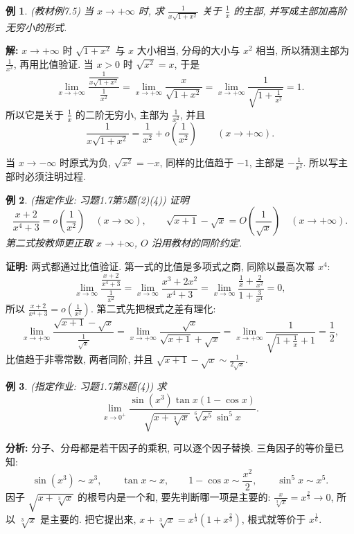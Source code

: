 \documentclass[UTF8,openany]{ctexbook}
\theoremstyle{chinesetextbook}
\newtheorem{example}{例}[section]
\newenvironment{cnproof}{\par\indent\textbf{证明:} \ignorespaces}{\par}
\newenvironment{cnsolution}{\par\indent\textbf{解:} \ignorespaces}{\par}
\begin{document}
\begin{example}
\textnormal{(教材例7.5)} 当 $x\to+\infty$ 时, 求 $\displaystyle\frac1{x\sqrt{1+x^2}}$ 关于 $\displaystyle\frac1x$ 的主部, 并写成主部加高阶无穷小的形式.
\end{example}
\begin{cnsolution}
$x\to+\infty$ 时 $\sqrt{1+x^2}$ 与 $x$ 大小相当, 分母的大小与 $x^2$ 相当, 所以猜测主部为 $\displaystyle\frac1{x^2}$, 再用比值验证. 当 $x>0$ 时 $\sqrt{x^2}=x$, 于是
\[
\lim_{x\to+\infty}\frac{\frac1{x\sqrt{1+x^2}}}{\frac1{x^2}}=\lim_{x\to+\infty}\frac x{\sqrt{1+x^2}}=\lim_{x\to+\infty}\frac1{\sqrt{1+\frac1{x^2}}}=1.
\]
所以它是关于 $\displaystyle\frac1x$ 的二阶无穷小, 主部为 $\displaystyle\frac1{x^2}$, 并且
\[
\frac1{x\sqrt{1+x^2}}=\frac1{x^2}+o\!\left(\frac1{x^2}\right)\qquad(x\to+\infty).
\]
\end{cnsolution}
当 $x\to-\infty$ 时原式为负, $\sqrt{x^2}=-x$, 同样的比值趋于 $-1$, 主部是 $\displaystyle-\frac1{x^2}$. 所以写主部时必须注明过程.
\begin{example}
\textnormal{(指定作业: 习题1.7第5题(2)(4))} 证明
\[
\frac{x+2}{x^4+3}=o\!\left(\frac1{x^2}\right)\quad(x\to\infty),\qquad\sqrt{x+1}-\sqrt x=O\!\left(\frac1{\sqrt x}\right)\quad(x\to+\infty).
\]
第二式按教师更正取 $x\to+\infty$, $O$ 沿用教材的同阶约定.
\end{example}
\begin{cnproof}
两式都通过比值验证. 第一式的比值是多项式之商, 同除以最高次幂 $x^4$:
\[
\lim_{x\to\infty}\frac{\frac{x+2}{x^4+3}}{\frac1{x^2}}=\lim_{x\to\infty}\frac{x^3+2x^2}{x^4+3}=\lim_{x\to\infty}\frac{\frac1x+\frac2{x^2}}{1+\frac3{x^4}}=0,
\]
所以 $\displaystyle\frac{x+2}{x^4+3}=o\!\left(\frac1{x^2}\right)$. 第二式先把根式之差有理化:
\[
\lim_{x\to+\infty}\frac{\sqrt{x+1}-\sqrt x}{\frac1{\sqrt x}}=\lim_{x\to+\infty}\frac{\sqrt x}{\sqrt{x+1}+\sqrt x}=\lim_{x\to+\infty}\frac1{\sqrt{1+\frac1x}+1}=\frac12,
\]
比值趋于非零常数, 两者同阶, 并且 $\displaystyle\sqrt{x+1}-\sqrt x\sim\frac1{2\sqrt x}$.
\end{cnproof}
\begin{example}
\textnormal{(指定作业: 习题1.7第8题(4))} 求
\[
\lim_{x\to0^+}\frac{\sin(x^3)\tan x(1-\cos x)}{\sqrt{x+\sqrt[3]x}\,\sqrt[6]{x^5}\sin^5x}.
\]
\end{example}
\par\indent\textbf{分析:} 分子、分母都是若干因子的乘积, 可以逐个因子替换. 三角因子的等价量已知:
\[
\sin(x^3)\sim x^3,\qquad\tan x\sim x,\qquad1-\cos x\sim\frac{x^2}2,\qquad\sin^5x\sim x^5.
\]
因子 $\sqrt{x+\sqrt[3]x}$ 的根号内是一个和, 要先判断哪一项是主要的: $\displaystyle\frac x{\sqrt[3]x}=x^{\frac23}\to0$, 所以 $\sqrt[3]x$ 是主要的. 把它提出来, $x+\sqrt[3]x=x^{\frac13}\left(1+x^{\frac23}\right)$, 根式就等价于 $x^{\frac16}$.
\end{document}
